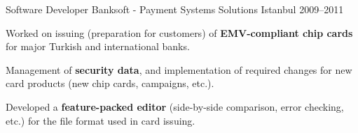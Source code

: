 \begin{cventries}
{\begin{cvitems}
      \end{cvitems}
    }
    {}

  \cventry
    {Software Developer} %
    {Banksoft - Payment Systems Solutions} %
    {Istanbul} %
    {2009--2011} %
    {
      \begin{cvitems} %
        \item {Worked on issuing (preparation for customers) of \textbf{EMV-compliant chip cards} for major Turkish and international banks.}
        \item Management of \textbf{security data}, and implementation of required changes for new card products (new chip cards, campaigns, etc.).
        \item Developed a \textbf{feature-packed editor} (side-by-side comparison, error checking, etc.) for the file format used in card issuing.
      \end{cvitems}
    }
    {}


\end{cventries}
